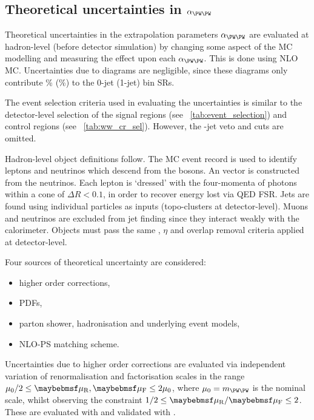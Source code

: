 \subsection{Theoretical uncertainties in $\alpha_{\WW}$}
\label{sec:ww_bkg:alpha}

Theoretical uncertainties in the extrapolation parameters $\alpha_{\WW}$ are evaluated 
at hadron-level (\ie before detector simulation) by changing some aspect of the MC 
modelling and measuring the effect upon each $\alpha_{\WW}$. This is done using NLO \WW 
MC. Uncertainties due to \ggWW diagrams are negligible, since these diagrams only 
contribute \% (\%) to the 0-jet (1-jet) bin SRs.

The event selection criteria used in evaluating the uncertainties is similar to the 
detector-level selection of the signal regions (see \Table~\ref{tab:event_selection}) 
and control regions (see \Table~\ref{tab:ww_cr_sel}). However, the \Pbottom-jet veto and 
\frecoil cuts are omitted.

Hadron-level object definitions follow. The MC event record is used to identify leptons 
and neutrinos which descend from the \PW bosons. An \metvec vector is constructed from 
the neutrinos. Each lepton is `dressed' with the four-momenta of photons within a cone of 
$\Delta R < 0.1$, in order to recover energy lost via QED FSR. Jets are found using 
individual particles as inputs (\cf topo-clusters at detector-level). Muons and neutrinos 
are excluded from jet finding since they interact weakly with the calorimeter. Objects 
must pass the same \pt, $\eta$ and overlap removal criteria applied at detector-level.

Four sources of theoretical uncertainty are considered:
\begin{itemize}[noitemsep,nolistsep]
	\item higher order corrections,
	\item PDFs,
	\item parton shower, hadronisation and underlying event models,
	\item NLO-PS matching scheme.
\end{itemize}

Uncertainties due to higher order corrections are evaluated via independent variation of 
renormalisation and factorisation scales in the range $\mu_0/2 \leq \mur,\muf 
\leq 2\mu_0$, where $\mu_0 = m_{\WW}$ is the nominal scale, whilst observing the 
constraint $1/2 \leq \mur/\muf \leq 2$. These are evaluated with \amcatnlo and validated 
with \mcfm.

